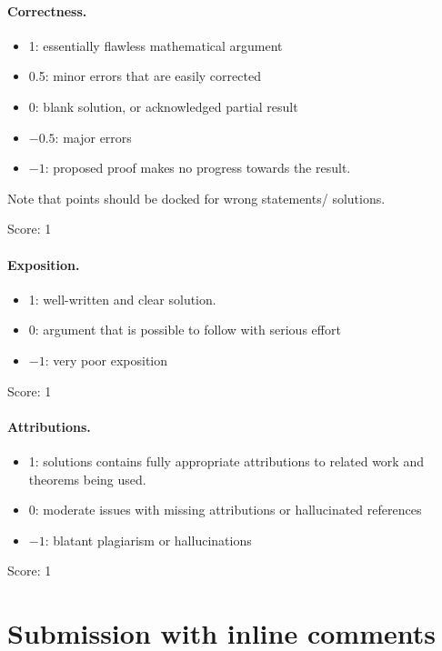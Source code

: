 \documentclass[11pt]{article}
\theoremstyle{remark}
\begin{document}
\paragraph{Correctness.}
\begin{itemize}
	\item  1: essentially flawless mathematical argument
	\item  0.5: minor errors that are easily corrected
	\item  0: blank solution, or acknowledged partial result
	\item  $-0.5$: major errors
	\item  $-1$: proposed proof makes no progress towards the result.
\end{itemize}
Note that points should be docked for wrong statements/ solutions.

\noindent Score: 1

\paragraph{Exposition.}
\begin{itemize}
	\item  1: well-written and clear solution.
	\item  0: argument that is possible to follow with serious effort
	\item  $-1$: very poor exposition
\end{itemize}

\noindent Score: 1

\paragraph{Attributions.}
\begin{itemize}
	\item  1: solutions contains fully appropriate attributions
		to related work and theorems being used.
	\item  0: moderate issues with missing attributions or hallucinated references
	\item  $-1$: blatant plagiarism or hallucinations
\end{itemize}

\noindent Score: 1

\newpage
\section{Submission with inline comments}
\end{document}
